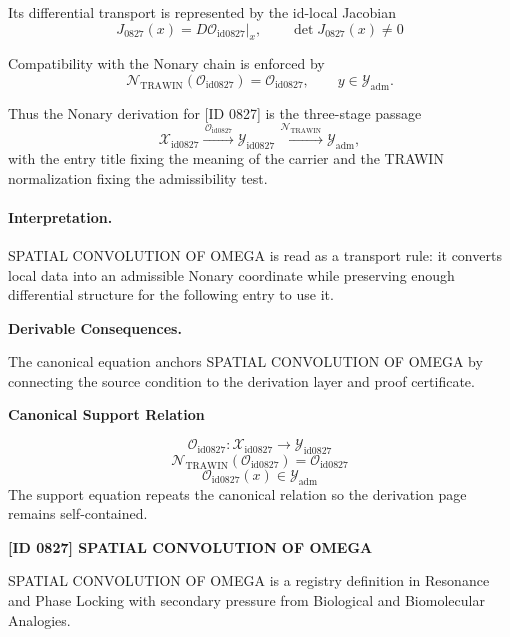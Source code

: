 Its differential transport is represented by the id-local Jacobian\[
J_{0827}(x)=D\mathcal{O}_{\mathrm{id0827}}\big|_x,\qquad \det J_{0827}(x)\neq 0
\]

Compatibility with the Nonary chain is enforced by\[
\mathcal{N}_{\mathrm{TRAWIN}}(\mathcal{O}_{\mathrm{id0827}})=\mathcal{O}_{\mathrm{id0827}},\qquad y\in\mathcal{Y}_{\mathrm{adm}}.
\]

Thus the Nonary derivation for [ID 0827] is the three-stage passage
\[
\mathcal{X}_{\mathrm{id0827}}\xrightarrow{\,\mathcal{O}_{\mathrm{id0827}}\,} \mathcal{Y}_{\mathrm{id0827}}\xrightarrow{\,\mathcal{N}_{\mathrm{TRAWIN}}\,} \mathcal{Y}_{\mathrm{adm}},
\]
with the entry title fixing the meaning of the carrier and the TRAWIN normalization fixing the admissibility test.

\paragraph{Interpretation.} SPATIAL CONVOLUTION OF OMEGA is read as a transport rule: it converts local data into an admissible Nonary coordinate while preserving enough differential structure for the following entry to use it.

\par\vspace{0.35em}
\noindent\textbf{Derivable Consequences.}\quad
\begingroup
\footnotesize
\raggedright
The canonical equation anchors SPATIAL CONVOLUTION OF OMEGA by connecting the source condition to the derivation layer and proof certificate.
\par\endgroup

\noindent\textbf{Canonical Support Relation}\par
\[
\mathcal{O}_{\mathrm{id0827}}:\mathcal{X}_{\mathrm{id0827}}\longrightarrow\mathcal{Y}_{\mathrm{id0827}}
\]
\[
\mathcal{N}_{\mathrm{TRAWIN}}(\mathcal{O}_{\mathrm{id0827}})=\mathcal{O}_{\mathrm{id0827}}
\]
\[
\mathcal{O}_{\mathrm{id0827}}(x)\in\mathcal{Y}_{\mathrm{adm}}
\]
\noindent The support equation repeats the canonical relation so the derivation page remains self-contained.\par

\clearpage
\noindent\textbf{[ID 0827] SPATIAL CONVOLUTION OF OMEGA}\par
\vspace{0.35em}
\begingroup\small
{}
SPATIAL CONVOLUTION OF OMEGA is a registry definition in Resonance and Phase Locking with secondary pressure from Biological and Biomolecular Analogies.


